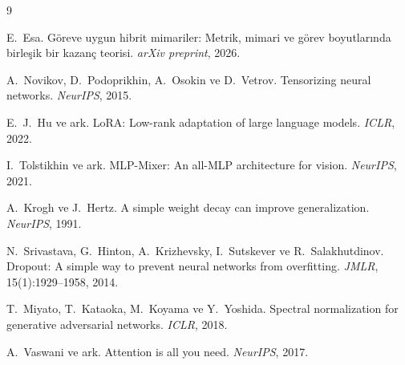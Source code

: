 \documentclass[11pt,a4paper]{article}
\begin{document}

\begin{thebibliography}{9}

E.~Esa. Göreve uygun hibrit mimariler: Metrik, mimari ve görev
boyutlarında birleşik bir kazanç teorisi. \emph{arXiv preprint}, 2026.

A.~Novikov, D.~Podoprikhin, A.~Osokin ve D.~Vetrov.
Tensorizing neural networks. \emph{NeurIPS}, 2015.

E.~J.~Hu ve ark. LoRA: Low-rank adaptation of large language
models. \emph{ICLR}, 2022.

I.~Tolstikhin ve ark. MLP-Mixer: An all-MLP architecture for
vision. \emph{NeurIPS}, 2021.

A.~Krogh ve J.~Hertz. A simple weight decay can improve
generalization. \emph{NeurIPS}, 1991.

N.~Srivastava, G.~Hinton, A.~Krizhevsky, I.~Sutskever ve
R.~Salakhutdinov. Dropout: A simple way to prevent neural
networks from overfitting. \emph{JMLR}, 15(1):1929--1958, 2014.

T.~Miyato, T.~Kataoka, M.~Koyama ve Y.~Yoshida. Spectral
normalization for generative adversarial networks.
\emph{ICLR}, 2018.

A.~Vaswani ve ark. Attention is all you need. \emph{NeurIPS}, 2017.

\end{thebibliography}
\end{document}
